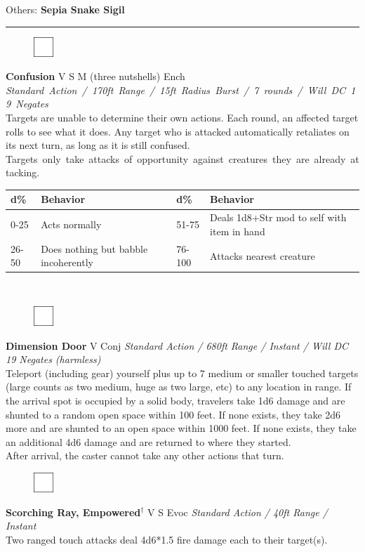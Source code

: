 \documentclass[letterpaper]{article}
\newcommand{\e}[1]{\emph{#1}}
\newcommand{\B}[1]{\textbf{#1}}
\newcommand{\D}[0]{$^\dag$}
\newcommand{\spell}[7]{
\begin{figure}
\vspace{-13pt}
\ifstrequal{#2}{Full}{  \includegraphics[width=2em]{Checkbox-Full}}{
\ifstrequal{#2}{Scroll}{\includegraphics[width=2em]{Checkbox-S}}{
                        \includegraphics[width=2em]{Checkbox}}}
\ifstrequal{#7}{}{\vspace{-1em}}{\vspace{#7}}
\end{figure}
 \B{#1} #3 {
    \ifstrequal{#4}{Conj}{\color{Plum}Conj}{%
    \ifstrequal{#4}{Divin}{\color{YellowOrange}Divin}{%
    \ifstrequal{#4}{Ench}{\color{VioletRed}Ench}{%
    \ifstrequal{#4}{Trans}{\color{LimeGreen}Trans}{%
    \ifstrequal{#4}{Evoc}{\color{RedOrange}Evoc}{%
    \ifstrequal{#4}{Illu}{\color{ProcessBlue}Illu}{%
    \ifstrequal{#4}{Abjur}{\color{CadetBlue}Abjur}{%
    \ifstrequal{#4}{Necro}{\color{Red}Necro}{%
}}}}}}}}}
{\footnotesize \e{#5}} \\
#6
}
\begin{document}
\begin{adjustwidth}{3em}{0em}
    Others: \B{Sepia Snake Sigil}\\[-1em]
\end{adjustwidth}

\hrule\vspace{0.5em}

\spell{Confusion}{}{V S M (three nutshells)}{Ench}{\mbox{Standard Action / 170ft Range / 15ft Radius Burst / 7 rounds / Will DC 19 Negates}}{
    Targets are unable to determine their own actions.  Each round, an affected target rolls to see what it does. Any target who is attacked automatically retaliates on its next turn, as long as it is still confused. \mbox{Targets only take attacks of opportunity against creatures they are already attacking.}\\
\begin{tabular}{l  l | l  l}
\footnotesize{d\%} & \footnotesize{Behavior} & \footnotesize{d\%} & \footnotesize{Behavior} \\
\hline
\footnotesize{0-25} & \footnotesize{Acts normally} & \footnotesize{51-75} & \footnotesize{Deals 1d8+Str mod to self with item in hand} \\
\footnotesize{26-50} & \footnotesize{Does nothing but babble incoherently} & \footnotesize{76-100} & \footnotesize{Attacks nearest creature} \\
\end{tabular}}{2em}\\ %

\spell{Dimension Door}{}{V}{Conj}{Standard Action / 680ft Range / Instant / Will DC 19 Negates (harmless)}{
Teleport (including gear) yourself plus up to 7 medium or smaller touched targets (large counts as two medium, huge as two large, etc) to any location in range. If the arrival spot is occupied by a solid body, travelers take 1d6 damage and are shunted to a random open space within 100 feet.  If none exists, they take 2d6 more and are shunted to an open space within 1000 feet.  If none exists, they take an additional 4d6 damage and are returned to where they started.\\After arrival, the caster cannot take any other actions that turn.}{2em}\\[-1em]

\spell{Scorching Ray, Empowered\D}{}{V S}{Evoc}{Standard Action / 40ft Range / Instant}{%
Two ranged touch attacks deal 4d6*1.5 fire damage each to their target(s).}{}\\[-1em] %
\end{document}
